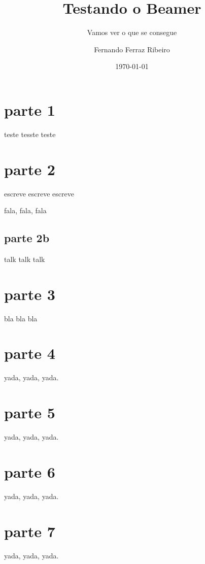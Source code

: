 \documentclass{beamer}
\title{Testando o Beamer}
\subtitle{Vamos ver o que se consegue}
\author{Fernando Ferraz Ribeiro}
\date{\today}
\begin{document}
\frame{\titlepage}
\section{parte 1}

\begin{frame}
teste tesste teste
\end{frame}

\section{parte 2}

\begin{frame}
escreve escreve escreve
\end{frame}

\begin{frame}
fala, fala, fala
\end{frame}

\subsection{parte 2b}
\begin{frame}
talk talk talk
\end{frame}



\section{parte 3}
\begin{frame}
bla bla bla
\end{frame}


\section{parte 4}
\begin{frame}
yada, yada, yada.
\end{frame}


\section{parte 5}
\begin{frame}
yada, yada, yada.
\end{frame}


\section{parte 6}
\begin{frame}
yada, yada, yada.
\end{frame}


\section{parte 7}
\begin{frame}
yada, yada, yada.
\end{frame}
\end{document}
